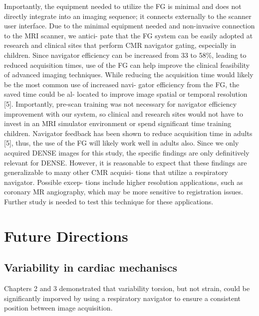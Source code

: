 	Importantly, the equipment needed to utilize the FG is minimal and does not directly integrate into an imaging sequence; it connects externally to the scanner user interface. Due to the minimal equipment needed and non-invasive connection to the MRI scanner, we antici- pate that the FG system can be easily adopted at research and clinical sites that perform CMR navigator gating, especially in children. Since navigator efficiency can be increased from 33 to 58\%, leading to reduced acquisition times, use of the FG can help improve the clinical feasibility of advanced imaging techniques. While reducing the acquisition time would likely be the most common use of increased navi- gator efficiency from the FG, the saved time could be al- located to improve image spatial or temporal resolution [5]. Importantly, pre-scan training was not necessary for navigator efficiency improvement with our system, so clinical and research sites would not have to invest in an MRI simulator environment or spend significant time training children. Navigator feedback has been shown to reduce acquisition time in adults [5], thus, the use of the FG will likely work well in adults also. Since we only acquired DENSE images for this study,
	the specific findings are only definitively relevant for DENSE. However, it is reasonable to expect that these findings are generalizable to many other CMR acquisi- tions that utilize a respiratory navigator. Possible excep- tions include higher resolution applications, such as coronary MR angiography, which may be more sensitive to registration issues. Further study is needed to test this technique for these applications.
	
\section{Future Directions}

\subsection{Variability in cardiac mechaniscs}
	Chapters 2 and 3 demonstrated that variability torsion, but not strain, could be significantly imporved by using a respiratory navigator to ensure a consistent position between image acquisition.
	
